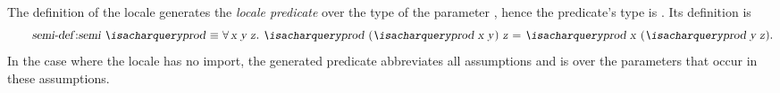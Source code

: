\begin{isabellebody}
\begin{isamarkuptext}
  The definition of the locale  generates the \emph{locale
  predicate}  over the type of the parameter ,
  hence the predicate's type is .  Its
  definition is
\begin{equation}
  \tag*{\isa{semi{\isacharunderscore}def}:} \isa{semi\ {\isacharquery}prod\ {\isasymequiv}\ {\isasymforall}x\ y\ z{\isachardot}\ {\isacharquery}prod\ {\isacharparenleft}{\isacharquery}prod\ x\ y{\isacharparenright}\ z\ {\isacharequal}\ {\isacharquery}prod\ x\ {\isacharparenleft}{\isacharquery}prod\ y\ z{\isacharparenright}}.
\end{equation}
  In the case where the locale has no import, the generated
  predicate abbreviates all assumptions and is over the parameters
  that occur in these assumptions.


\end{isamarkuptext}
\end{isabellebody}
